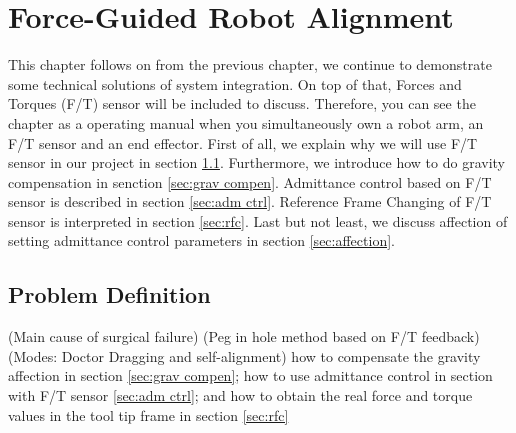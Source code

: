 \chapter{Force-Guided Robot Alignment}
This chapter follows on from the previous chapter, we continue to demonstrate some technical solutions of system integration. On top of that, Forces and Torques (F/T) sensor will be included to discuss. Therefore, you can see the chapter as a operating manual when you simultaneously own a robot arm, an F/T sensor and an end effector. First of all, we explain why we will use F/T sensor in our project in section \ref{sec:pro def}. Furthermore, we introduce how to do gravity compensation in senction \ref{sec:grav compen}. Admittance control based on F/T sensor is described in section \ref{sec:adm ctrl}. Reference Frame Changing of F/T sensor is interpreted in section \ref{sec:rfc}. Last but not least, we discuss affection of setting admittance control parameters in section \ref{sec:affection}.
\section{Problem Definition}
\label{sec:pro def}
(Main cause of surgical failure)
(Peg in hole method based on F/T feedback)
(Modes: Doctor Dragging and self-alignment)
how to compensate the gravity affection in section \ref{sec:grav compen}; how to use admittance control in section with F/T sensor \ref{sec:adm ctrl}; and how to obtain the real force and torque values in the tool tip frame in section \ref{sec:rfc}
